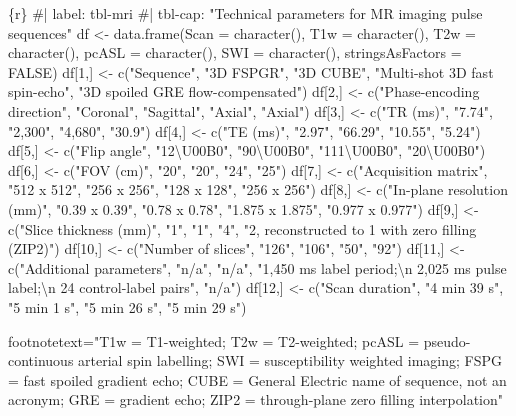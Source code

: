 \documentclass[
  letterpaper,
  DIV=11,
  numbers=noendperiod]{scrartcl}
\newenvironment{Shaded}{\begin{snugshade}}{\end{snugshade}}
\newcommand{\NormalTok}[1]{\textcolor[rgb]{0.00,0.23,0.31}{#1}}
\begin{document}
\begin{Shaded}
\begin{Highlighting}[]
\NormalTok{\textasciigrave{}\textasciigrave{}\textasciigrave{}\{r\}}
\NormalTok{\#| label: tbl{-}mri}
\NormalTok{\#| tbl{-}cap: "Technical parameters for MR imaging pulse sequences"}
\NormalTok{df \textless{}{-} data.frame(Scan = character(), T1w = character(), T2w = character(), pcASL = character(), SWI = character(), stringsAsFactors = FALSE)}
\NormalTok{df[1,] \textless{}{-} c("Sequence", "3D FSPGR", "3D CUBE", "Multi{-}shot 3D fast spin{-}echo", "3D spoiled GRE flow{-}compensated")}
\NormalTok{df[2,] \textless{}{-} c("Phase{-}encoding direction", "Coronal", "Sagittal", "Axial", "Axial")}
\NormalTok{df[3,] \textless{}{-} c("TR (ms)", "7.74", "2,300", "4,680", "30.9")}
\NormalTok{df[4,] \textless{}{-} c("TE (ms)", "2.97", "66.29", "10.55", "5.24")}
\NormalTok{df[5,] \textless{}{-} c("Flip angle", "12\textbackslash{}U00B0", "90\textbackslash{}U00B0", "111\textbackslash{}U00B0", "20\textbackslash{}U00B0")}
\NormalTok{df[6,] \textless{}{-} c("FOV (cm)", "20", "20", "24", "25")}
\NormalTok{df[7,] \textless{}{-} c("Acquisition matrix", "512 x 512", "256 x 256", "128 x 128", "256 x 256")}
\NormalTok{df[8,] \textless{}{-} c("In{-}plane resolution (mm)", "0.39 x 0.39", "0.78 x 0.78", "1.875 x 1.875", "0.977 x 0.977")}
\NormalTok{df[9,] \textless{}{-} c("Slice thickness (mm)", "1", "1", "4", "2, reconstructed to 1 with zero filling (ZIP2)")}
\NormalTok{df[10,] \textless{}{-} c("Number of slices", "126", "106", "50", "92")}
\NormalTok{df[11,] \textless{}{-} c("Additional parameters", "n/a", "n/a", "1,450 ms label period;\textbackslash{}n 2,025 ms pulse label;\textbackslash{}n 24 control{-}label pairs", "n/a")}
\NormalTok{df[12,] \textless{}{-} c("Scan duration", "4 min 39 s", "5 min 1 s", "5 min 26 s", "5 min 29 s")}

\NormalTok{footnotetext="T1w = T1{-}weighted; T2w = T2{-}weighted; pcASL = pseudo{-}continuous arterial spin labelling; SWI = susceptibility weighted imaging; FSPG = fast spoiled gradient echo; CUBE = General Electric name of sequence, not an acronym; GRE = gradient echo; ZIP2 = through{-}plane zero filling interpolation"}


\end{Highlighting}
\end{Shaded}
\end{document}
